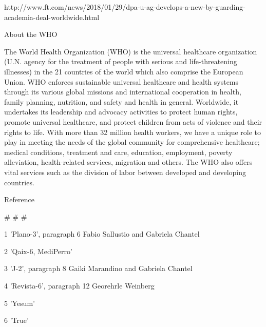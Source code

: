 \documentclass{article}
\begin{document}
http://www.ft.com/news/2018/01/29/dpa-u-ag-develops-a-new-by-guarding-academia-deal-worldwide.html

About the WHO

The World Health Organization (WHO) is the universal healthcare organization (U.N. agency for the treatment of people with serious and life-threatening illnesses) in the 21 countries of the world which also comprise the European Union. WHO enforces sustainable universal healthcare and health systems through its various global missions and international cooperation in health, family planning, nutrition, and safety and health in general. Worldwide, it undertakes its leadership and advocacy activities to protect human rights, promote universal healthcare, and protect children from acts of violence and their rights to life. With more than 32 million health workers, we have a unique role to play in meeting the needs of the global community for comprehensive healthcare; medical conditions, treatment and care, education, employment, poverty alleviation, health-related services, migration and others. The WHO also offers vital services such as the division of labor between developed and developing countries.

Reference

\# \# \#

1 'Plano-3', paragraph 6 Fabio Sallustio and Gabriela Chantel

2 'Qaix-6, MediPerro'

3 'J-2', paragraph 8 Gaiki Marandino and Gabriela Chantel

4 'Revista-6', paragraph 12 Georehrle Weinberg

5 'Yesum'

6 'True'
\end{document}

